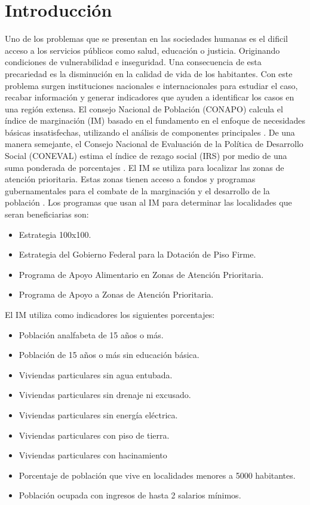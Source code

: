 \section{Introducción}

Uno de los problemas que se presentan en las sociedades humanas es el dificil acceso a los servicios públicos como salud, educación o justicia. Originando condiciones de vulnerabilidad e inseguridad. Una consecuencia de esta precariedad es la disminución en la calidad de vida de los habitantes. Con este problema surgen instituciones nacionales e internacionales para estudiar el caso, recabar información y generar indicadores que ayuden a identificar los casos en una región extensa. El consejo Nacional de Población (CONAPO) calcula el índice de marginación (IM) basado en el fundamento en el enfoque de necesidades básicas insatisfechas, utilizando el análisis de componentes principales \cite{conapo_2021}. De una manera semejante, el Consejo Nacional de Evaluación de la Política de Desarrollo Social (CONEVAL) estima el índice de rezago social (IRS) por medio de una suma ponderada de porcentajes \cite{CONEVAL_2007}.  El IM se utiliza para localizar las zonas de atención prioritaria. Estas zonas tienen acceso a fondos y programas gubernamentales para el combate de la marginación y el desarrollo de la población \cite{DOF_2011,DOF_2012,DOF_2013,DOF_2014,DOF_2015,DOF_2016,DOF_2017,DOF_2018,DOF_2019}. Los programas que usan al IM para determinar las localidades que seran beneficiarias son:

\begin{itemize}
    \item Estrategia 100x100\cite{CONEVAL_2013}.
    \item Estrategia del Gobierno Federal para la Dotación de Piso Firme\cite{DOF_2020}.
    \item Programa de Apoyo Alimentario en Zonas de Atención Prioritaria\cite{SEDESOL_2008}.
    \item Programa de Apoyo a Zonas de Atención Prioritaria\cite{DOF_2014_zonas}.
\end{itemize}


El IM utiliza como indicadores\cite{CONAPO_2022} los siguientes porcentajes:

\begin{itemize}
    \item Población analfabeta de 15 años o más.
    \item Población de 15 años o más sin educación básica.
    \item Viviendas particulares sin agua entubada.
    \item Viviendas particulares sin drenaje ni excusado.
    \item Viviendas particulares sin energía eléctrica.
    \item Viviendas particulares con piso de tierra.
    \item Viviendas particulares con hacinamiento
    \item Porcentaje de población que vive en localidades menores a 5000 habitantes.
    \item Población ocupada con ingresos de hasta 2 salarios mínimos.
\end{itemize}


